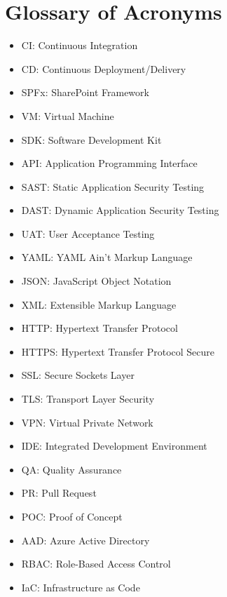 \chapter*{Glossary of Acronyms}

\begin{itemize}
    \item CI: Continuous Integration
    \item CD: Continuous Deployment/Delivery
    \item SPFx: SharePoint Framework
    \item VM: Virtual Machine
    \item SDK: Software Development Kit
    \item API: Application Programming Interface
    \item SAST: Static Application Security Testing
    \item DAST: Dynamic Application Security Testing
    \item UAT: User Acceptance Testing
    \item YAML: YAML Ain't Markup Language
    \item JSON: JavaScript Object Notation
    \item XML: Extensible Markup Language
    \item HTTP: Hypertext Transfer Protocol
    \item HTTPS: Hypertext Transfer Protocol Secure
    \item SSL: Secure Sockets Layer
    \item TLS: Transport Layer Security
    \item VPN: Virtual Private Network
    \item IDE: Integrated Development Environment
    \item QA: Quality Assurance
    \item PR: Pull Request
    \item POC: Proof of Concept
    \item AAD: Azure Active Directory
    \item RBAC: Role-Based Access Control
    \item IaC: Infrastructure as Code
\end{itemize}